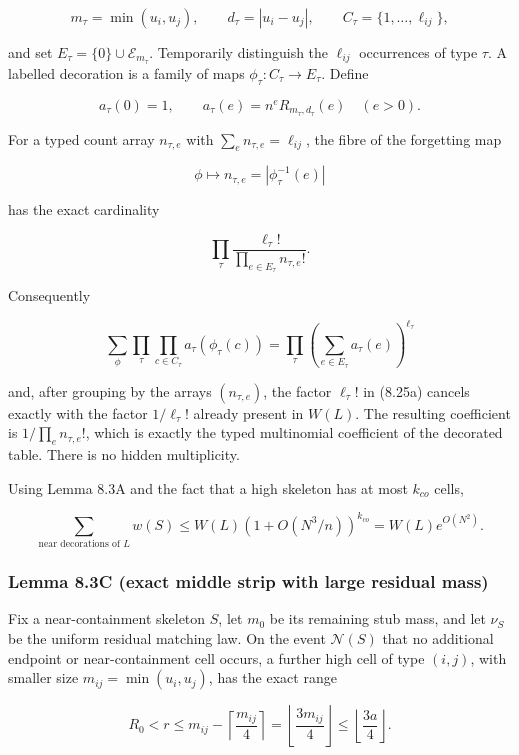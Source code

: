 \documentclass[11pt]{article}
\begin{document}
\[
 m_\tau=\min(u_i,u_j),\qquad d_\tau=|u_i-u_j|,
 \qquad C_\tau=\{1,\ldots,\ell_{ij}\},
\]

and set \(E_\tau=\{0\}\cup\mathcal E_{m_\tau}\). Temporarily distinguish the \(\ell_{ij}\) occurrences of type \(\tau\). A labelled decoration is a family of maps \(\phi_\tau:C_\tau\to E_\tau\). Define

\[
 a_\tau(0)=1,
 \qquad
 a_\tau(e)=n^eR_{m_\tau,d_\tau}(e)\quad(e>0).
\]

For a typed count array \(n_{\tau,e}\) with \(\sum_e n_{\tau,e}=\ell_{ij}\), the fibre of the forgetting map

\[
 \phi\longmapsto n_{\tau,e}=|\phi_\tau^{-1}(e)|
\]

has the exact cardinality

\[
 \prod_\tau\frac{\ell_\tau!}{\prod_{e\in E_\tau}n_{\tau,e}!}.
 \tag{8.25a}
\]

Consequently

\[
 \sum_\phi\prod_{\tau}\prod_{c\in C_\tau}a_\tau(\phi_\tau(c))
 =\prod_\tau\left(\sum_{e\in E_\tau}a_\tau(e)\right)^{\ell_\tau}
 \tag{8.25b}
\]

and, after grouping by the arrays \((n_{\tau,e})\), the factor \(\ell_\tau!\) in (8.25a) cancels exactly with the factor \(1/\ell_\tau!\) already present in \(W(L)\). The resulting coefficient is \(1/\prod_e n_{\tau,e}!\), which is exactly the typed multinomial coefficient of the decorated table. There is no hidden multiplicity.

Using Lemma 8.3A and the fact that a high skeleton has at most \(k_{co}\) cells,

\[
 \sum_{\text{near decorations of }L}w(S)
 \le W(L)(1+O(N^3/n))^{k_{co}}
 =W(L)e^{O(N^2)}.
 \tag{8.26}
\]

\subsubsection{Lemma 8.3C (exact middle strip with large residual mass)}\label{lemma-8.3c-exact-middle-strip-with-large-residual-mass}

Fix a near-containment skeleton \(S\), let \(m_0\) be its remaining stub mass, and let \(\nu_S\) be the uniform residual matching law. On the event \(\mathcal N(S)\) that no additional endpoint or near-containment cell occurs, a further high cell of type \((i,j)\), with smaller size \(m_{ij}=\min(u_i,u_j)\), has the exact range

\[
 R_0<r\le m_{ij}-\left\lceil\frac{m_{ij}}4\right\rceil
 =\left\lfloor\frac{3m_{ij}}4\right\rfloor
 \le\left\lfloor\frac{3a}4\right\rfloor.
 \tag{8.26a}
\]
\end{document}
